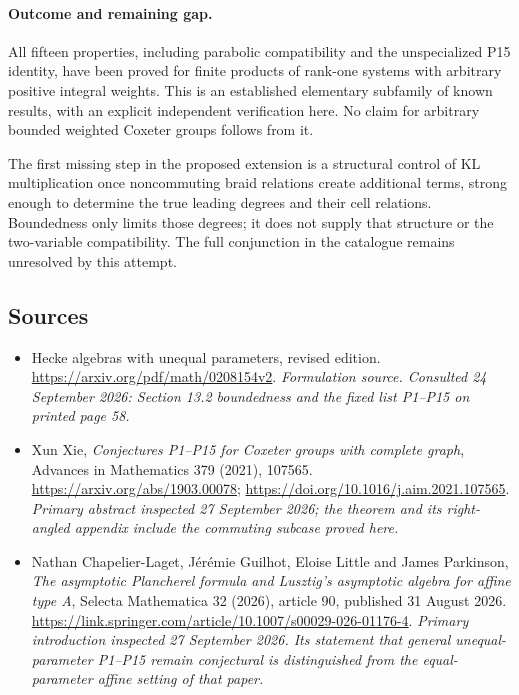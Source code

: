 \documentclass[11pt]{article}
\begin{document}
\paragraph{Outcome and remaining gap.}
All fifteen properties, including parabolic compatibility and the
unspecialized P15 identity, have been proved for finite products of
rank-one systems with arbitrary positive integral weights. This is an
established elementary subfamily of known results, with an explicit
independent verification here. No claim for arbitrary bounded weighted
Coxeter groups follows from it.

The first missing step in the proposed extension is a structural
control of KL multiplication once noncommuting braid relations create
additional terms, strong enough to determine the true leading degrees
and their cell relations. Boundedness only limits those degrees;
it does not supply that structure or the two-variable compatibility.
The full conjunction in the catalogue remains unresolved by this attempt.

\subsection{Sources}
\begin{itemize}
\item[S1]Hecke algebras with unequal parameters, revised edition.
\url{https://arxiv.org/pdf/math/0208154v2}.
\textit{Formulation source. Consulted 24 September 2026: Section 13.2 boundedness and the fixed list P1–P15 on printed page 58.}
\item[E1]Xun Xie, \emph{Conjectures P1--P15 for Coxeter groups with
complete graph}, Advances in Mathematics 379 (2021), 107565.
\url{https://arxiv.org/abs/1903.00078};
\url{https://doi.org/10.1016/j.aim.2021.107565}.
\textit{Primary abstract inspected 27 September 2026; the theorem and
its right-angled appendix include the commuting subcase proved here.}
\item[E2]Nathan Chapelier-Laget, J\'er\'emie Guilhot, Eloise Little and
James Parkinson, \emph{The asymptotic Plancherel formula and Lusztig's
asymptotic algebra for affine type A}, Selecta Mathematica 32 (2026),
article 90, published 31 August 2026.
\url{https://link.springer.com/article/10.1007/s00029-026-01176-4}.
\textit{Primary introduction inspected 27 September 2026. Its statement
that general unequal-parameter P1--P15 remain conjectural is
distinguished from the equal-parameter affine setting of that paper.}
\end{itemize}
\end{document}

